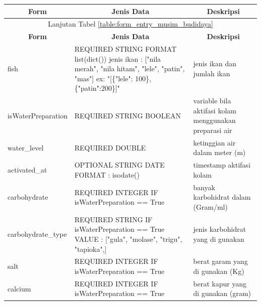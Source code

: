 \begin{enumerate}[1.]
\begin{longtable}{| l | p{5cm} | p{5cm} |}
\hline
\multicolumn{1}{|c|}{\textbf{Form}} & \multicolumn{1}{|c|}{\textbf{Jenis Data}} & \multicolumn{1}{|c|}{\textbf{Deskripsi}}\\
\hline
\endfirsthead

\hline
\multicolumn{3}{|c|}{Lanjutan Tabel \ref{table:form_entry_musim_budidaya}}\\
\hline
\multicolumn{1}{|c|}{\textbf{Form}} & \multicolumn{1}{|c|}{\textbf{Jenis Data}} & \multicolumn{1}{|c|}{\textbf{Deskripsi}}\\
\hline
\endhead

                                          
fish               & REQUIRED STRING FORMAT list(dict()) jenis ikan : {[}"nila merah", "nila hitam", "lele", "patin", "mas"{]} ex: "{[}\{"lele": 100\},\{"patin":200\}{]}" & jenis ikan dan jumlah ikan                             \\ \hline
isWaterPreparation & REQUIRED STRING BOOLEAN                                                                                                                               & variable bila aktifasi kolam menggunakan preparasi air \\ \hline
water\_level       & REQUIRED DOUBLE                                                                                                                                       & ketinggian air dalam meter (m)                         \\ \hline
activated\_at      & OPTIONAL STRING DATE FORMAT : isodate()                                                                                                               & timestamp aktifasi kolam                               \\ \hline
carbohydrate       & REQUIRED INTEGER IF isWaterPreparation == True                                                                                                        & banyak karbohidrat dalam (Gram/ml)                     \\ \hline
carbohydrate\_type & REQUIRED STRING IF isWaterPreparation == True VALUE : {[}"gula", "molase", "trigu", "tapioka",{]}                                                     & jenis karbohidrat yang di gunakan                      \\ \hline
salt               & REQUIRED INTEGER IF isWaterPreparation == True                                                                                                        & berat garam yang di gunakan (Kg)                       \\ \hline
calcium            & REQUIRED INTEGER IF isWaterPreparation == True                                                                                                        & berat kapur yang di gunakan (gram)                     \\ \hline


\end{longtable}
\end{enumerate}
